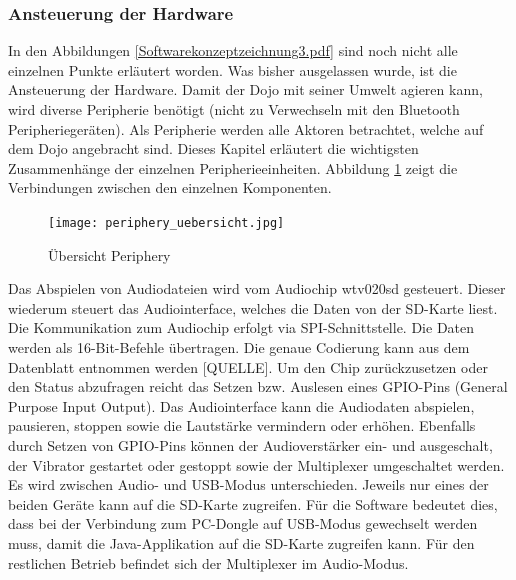 \subsubsection{Ansteuerung der Hardware }
In den Abbildungen \ref{Softwarekonzeptzeichnung3.pdf} sind noch nicht alle einzelnen Punkte erläutert worden. Was bisher ausgelassen wurde, ist die Ansteuerung der Hardware. Damit der Dojo mit seiner Umwelt agieren kann, wird diverse Peripherie benötigt (nicht zu Verwechseln mit den Bluetooth Peripheriegeräten). Als Peripherie werden alle Aktoren betrachtet, welche auf dem Dojo angebracht sind. Dieses Kapitel erläutert die wichtigsten Zusammenhänge der einzelnen Peripherieeinheiten. Abbildung \ref{fig:p_uebersicht} zeigt die Verbindungen zwischen den einzelnen Komponenten.
\begin{figure}[htb]
\begin{center}
\texttt{[image: periphery\_uebersicht.jpg]}
\caption{Übersicht Periphery} %
\label{fig:p_uebersicht}
\end{center}
\end{figure}
Das Abspielen von Audiodateien wird vom Audiochip wtv020sd gesteuert. Dieser wiederum steuert das Audiointerface, welches die Daten von der SD-Karte liest. Die Kommunikation zum Audiochip erfolgt via SPI-Schnittstelle. Die Daten werden als 16-Bit-Befehle übertragen. Die genaue Codierung kann aus dem Datenblatt entnommen werden [QUELLE]. Um den Chip zurückzusetzen oder den Status abzufragen reicht das Setzen bzw. Auslesen eines GPIO-Pins (General Purpose Input Output). Das Audiointerface kann die Audiodaten abspielen, pausieren, stoppen sowie die Lautstärke vermindern oder erhöhen. 
Ebenfalls durch Setzen von GPIO-Pins können der Audioverstärker ein- und ausgeschalt, der Vibrator gestartet oder gestoppt sowie der Multiplexer umgeschaltet werden. Es wird zwischen Audio- und USB-Modus unterschieden. Jeweils nur eines der beiden Geräte kann auf die SD-Karte zugreifen. Für die Software bedeutet dies, dass bei der Verbindung zum PC-Dongle auf USB-Modus gewechselt werden muss, damit die Java-Applikation auf die SD-Karte zugreifen kann. Für den restlichen Betrieb befindet sich der Multiplexer im Audio-Modus.
